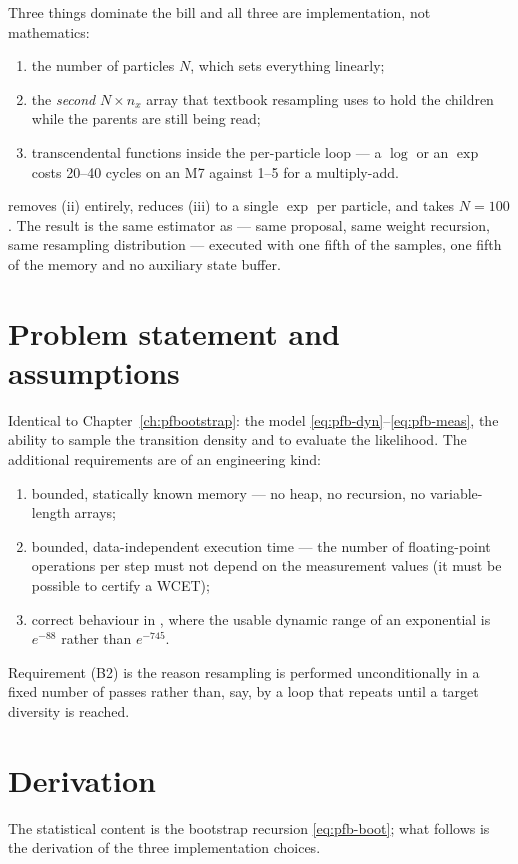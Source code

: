 Three things dominate the bill and all three are implementation, not mathematics:
\begin{enumerate}[label=(\roman*),leftmargin=2.5em]
  \item the number of particles $N$, which sets everything linearly;
  \item the \emph{second} $N\times n_x$ array that textbook resampling uses to hold the children
        while the parents are still being read;
  \item transcendental functions inside the per-particle loop --- a $\log$ or an $\exp$ costs
        \numrange{20}{40} cycles on an M7 against \numrange{1}{5} for a multiply-add.
\end{enumerate}
 removes (ii) entirely, reduces (iii) to a single $\exp$ per particle, and takes
$N = 100$.  The result is the same estimator as  --- same proposal, same
weight recursion, same resampling distribution --- executed with one fifth of the samples, one
fifth of the memory and no auxiliary state buffer.

\section{Problem statement and assumptions}
Identical to Chapter~\ref{ch:pfbootstrap}: the model \eqref{eq:pfb-dyn}--\eqref{eq:pfb-meas}, the
ability to sample the transition density and to evaluate the likelihood.  The additional
requirements are of an engineering kind:
\begin{enumerate}[label=(B\arabic*),leftmargin=3em]
  \item bounded, statically known memory --- no heap, no recursion, no variable-length arrays;
  \item bounded, data-independent execution time --- the number of floating-point operations per
        step must not depend on the measurement values (it must be possible to certify a WCET);
  \item correct behaviour in , where the usable dynamic range of an exponential is
        $e^{-88}$ rather than $e^{-745}$.
\end{enumerate}
Requirement (B2) is the reason resampling is performed unconditionally in a fixed number of passes
rather than, say, by a loop that repeats until a target diversity is reached.

\section{Derivation}
The statistical content is the bootstrap recursion \eqref{eq:pfb-boot}; what follows is the
derivation of the three implementation choices.

